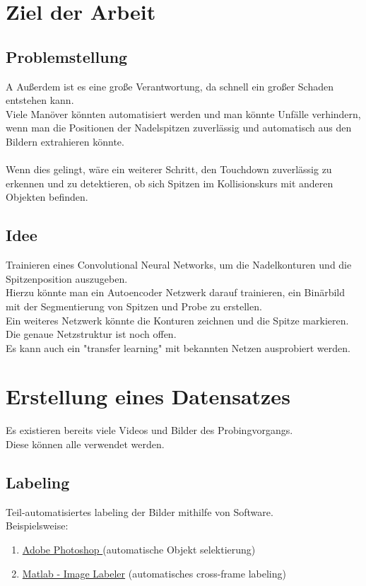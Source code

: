 \documentclass{article}
\begin{document}
	\section{Ziel der Arbeit}
	\subsection{Problemstellung}
A	Außerdem ist es eine große Verantwortung, da schnell ein großer Schaden entstehen kann.\\
	Viele Manöver könnten automatisiert werden und man könnte Unfälle verhindern, wenn man die Positionen der Nadelspitzen zuverlässig und automatisch aus den Bildern extrahieren könnte.\\
	\\
	Wenn dies gelingt, wäre ein weiterer Schritt, den Touchdown zuverlässig zu erkennen und zu detektieren, ob sich Spitzen im Kollisionskurs mit anderen Objekten befinden.
	\subsection{Idee}
	Trainieren eines Convolutional Neural Networks, um die Nadelkonturen und die Spitzenposition auszugeben.\\
	Hierzu könnte man ein Autoencoder Netzwerk darauf trainieren, ein Binärbild mit der Segmentierung von Spitzen und Probe zu erstellen.\\
	Ein weiteres Netzwerk könnte die Konturen zeichnen und die Spitze markieren.\\
	Die genaue Netzstruktur ist noch offen.\\
	Es kann auch ein "transfer learning" mit bekannten Netzen ausprobiert werden.

	\section{Erstellung eines Datensatzes}
	Es existieren bereits viele Videos und Bilder des Probingvorgangs.\\
	Diese können alle verwendet werden.
	\subsection{Labeling}
	Teil-automatisiertes labeling der Bilder mithilfe von Software.\\
	Beispielsweise:
	\begin{enumerate}
		\item \href{https://www.adobe.com/products/photoshop.html}{Adobe Photoshop } (automatische Objekt selektierung)
		\item \href{https://www.mathworks.com/help/vision/ref/imagelabeler-app.html}{Matlab - Image Labeler} (automatisches cross-frame labeling)
	\end{enumerate} 
\end{document}
